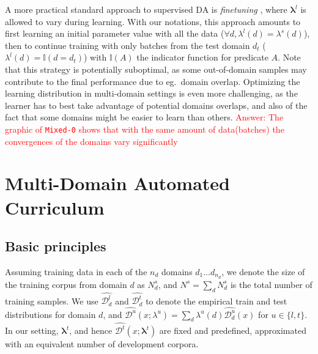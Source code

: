 \documentclass[11pt]{article}
\newcommand{\fyTodo}[1]{\Todo[FY:]{\textcolor{orange}{#1}}}
\newcommand{\revision}[1]{\textcolor{red}{#1}}
\newcommand{\system}[1]{\texttt{{#1}}}
\newcommand{\vlambda}{\ensuremath{\boldsymbol\lambda}\xspace} %
\newcommand{\indic}[1]{\ensuremath{\mathbb{I}(#1)}}
\begin{document}
A more practical standard approach to supervised DA is \emph{finetuning} \cite{Luong15stanford,Freitag16fast}, where $\vlambda^{l}$ is allowed to vary during learning. With our notations, this approach amounts to first learning an initial parameter value with all the data ($\forall d, \lambda^{l}(d) = \lambda^{s}(d)$), then to continue training with only batches from the test domain $d_t$ ($\lambda^{l}(d) = \indic{d = d_t}$) with $\indic{A}$ the indicator function for predicate $A$. Note that this strategy is potentially suboptimal, as some out-of-domain samples may contribute to the final performance due to eg.\ domain overlap. Optimizing the learning distribution in multi-domain settings is even more challenging, as the learner has to best take advantage of potential domains overlaps, and also of the fact that some domains might be easier to learn than others.\fyTodo{How to measure this?} \revision{Answer: The graphic of \system{Mixed-0} shows that with the same amount of data(batches) the convergences of the domains vary significantly}


\section{Multi-Domain Automated Curriculum } \label{sec:mdac}
\subsection{Basic principles}
Assuming training data in each of the $n_d$ domains $d_1 \dots d_{n_d}$, we denote the size of the training corpus from domain $d$ as $N^{s}_d$, and $N^{s} = \sum_d N^{s}_d$ is the total number of training samples. We use $\widehat{\mathcal{D}^l_d}$ and $\widehat{\mathcal{D}^t _d}$ to denote the empirical train and test distributions for domain $d$, and $\widehat{\mathcal{D}^{u}}(x;\lambda^{u}) = \sum_{d} \lambda^{u}(d) \widehat{\mathcal{D}^{u}_d}(x)$ for $u\in\{l,t\}$. In our setting,  $\vlambda^t$, and hence $\widehat{\mathcal{D}^t}(x;\vlambda^t)$ are fixed and predefined, approximated with an equivalent number of development corpora. 
\end{document}
